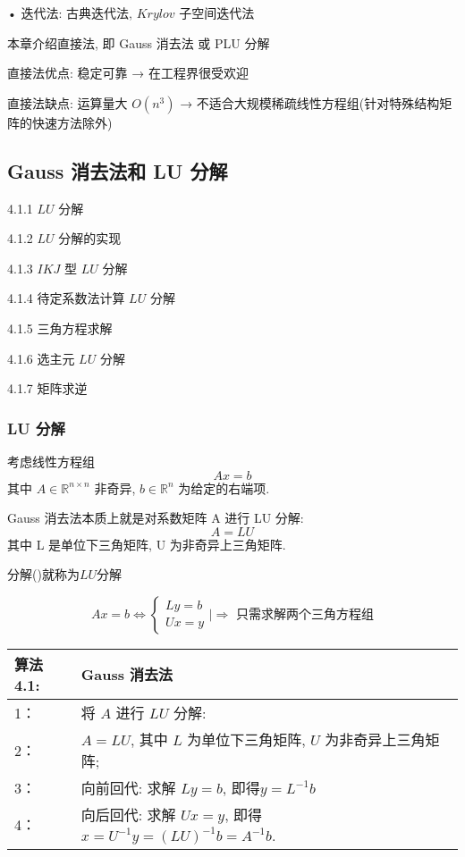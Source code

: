 \documentclass[12pt,a4paper]{article}
\begin{document}
• 迭代法: 古典迭代法, $Krylov$ 子空间迭代法

本章介绍直接法, 即 Gauss 消去法 或 PLU 分解

直接法优点: 稳定可靠 → 在工程界很受欢迎

直接法缺点: 运算量大 $O(n^3)$ → 不适合大规模稀疏线性方程组(针对特殊结构矩阵的快速方法除外)

\subsection{Gauss 消去法和 LU 分解}

4.1.1 $LU$ 分解

4.1.2 $LU$ 分解的实现

4.1.3 $IKJ$ 型 $LU$ 分解

4.1.4 待定系数法计算 $LU$ 分解

4.1.5 三角方程求解

4.1.6 选主元 $LU$ 分解

4.1.7 矩阵求逆

\subsubsection{LU 分解}
考虑线性方程组
\begin{equation}
A x=b
\end{equation}
其中 $A ∈ \mathbb{R}^{n×n}$ 非奇异, $b ∈ \mathbb{R}^n$ 为给定的右端项.

\begin{framed}
	Gauss 消去法本质上就是对系数矩阵 A 进行 LU 分解:
	\begin{equation}
	A=L U
	\end{equation}
	其中 L 是单位下三角矩阵, U 为非奇异上三角矩阵.
\end{framed}

分解()就称为$LU$分解

\begin{equation}
A x=b \Longleftrightarrow\left\{\begin{array}{l}{L y=b} \\ {U x=y}\end{array} | \Longrightarrow \text{ 只需求解两个三角方程组} \right.
\end{equation}

\begin{table}  
	\begin{tabular*}{16cm}{ll}  
		\hline  
		算法4.1: & Gauss 消去法 \\  
		\hline  
		1：   &将 $A$ 进行 $LU$ 分解:\\  
		2：   &$A = LU$, 其中 $L$ 为单位下三角矩阵, $U$ 为非奇异上三角矩阵;\\
		3：   &向前回代: 求解 $Ly = b$, 即得$ y = L^{-1}b$\\
		4：   &向后回代: 求解 $Ux = y$, 即得 $x = U^{-1}y = (LU)^{-1}b = A^{-1}b$.\\  
		\hline  
	\end{tabular*}  
\end{table} 
\end{document}
